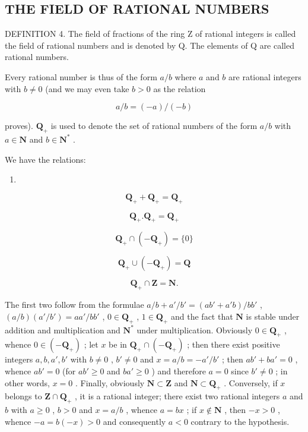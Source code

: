 \subsection{THE FIELD OF RATIONAL NUMBERS}

DEFINITION 4. The field of fractions of the ring Z of rational integers is called the field of rational numbers and is denoted by Q. The elements of Q are called rational numbers.

Every rational number is thus of the form \(a / b\) where \(a\) and \(b\) are rational integers with \(b \neq 0\) (and we may even take \(b > 0\) as the relation

\[
a / b = (- a) / (- b)
\]

proves). \(\mathbf{Q}_{+}\) is used to denote the set of rational numbers of the form \(a / b\) with \(a\in \mathbf{N}\) and \(b\in \mathbf{N}^*\) .

We have the relations:

\begin{enumerate}
\def\labelenumi{(\arabic{enumi})}
\tightlist
\item
\end{enumerate}

\[
\mathbf {Q} _ {+} + \mathbf {Q} _ {+} = \mathbf {Q} _ {+}\tag{2}
\]

\[
\mathbf {Q} _ {+}. \mathbf {Q} _ {+} = \mathbf {Q} _ {+}\tag{3}
\]

\[
\mathbf {Q} _ {+} \cap (- \mathbf {Q} _ {+}) = \{0 \}\tag{4}
\]

\[
\mathbf {Q} _ {+} \cup (- \mathbf {Q} _ {+}) = \mathbf {Q}\tag{5}
\]

\[
\mathbf {Q} _ {+} \cap \mathbf {Z} = \mathbf {N}.
\]

The first two follow from the formulae \(a / b + a' / b' = (ab' + a'b) / bb'\) , \((a / b)(a'/b') = aa'/bb'\) , \(0 \in \mathbf{Q}_+\) , \(1 \in \mathbf{Q}_+\) and the fact that \(\mathbf{N}\) is stable under addition and multiplication and \(\mathbf{N}^*\) under multiplication. Obviously \(0 \in \mathbf{Q}_+\) , whence \(0 \in (-\mathbf{Q}_+)\) ; let \(x\) be in \(\mathbf{Q}_+ \cap (-\mathbf{Q}_+)\) ; then there exist positive integers \(a, b, a', b'\) with \(b \neq 0\) , \(b' \neq 0\) and \(x = a / b = -a'/b'\) ; then \(ab' + ba' = 0\) , whence \(ab' = 0\) (for \(ab' \geqslant 0\) and \(ba' \geqslant 0\) ) and therefore \(a = 0\) since \(b' \neq 0\) ; in other words, \(x = 0\) . Finally, obviously \(\mathbf{N} \subset \mathbf{Z}\) and \(\mathbf{N} \subset \mathbf{Q}_+\) . Conversely, if \(x\) belongs to \(\mathbf{Z} \cap \mathbf{Q}_+\) , it is a rational integer; there exist two rational integers \(a\) and \(b\) with \(a \geqslant 0\) , \(b > 0\) and \(x = a / b\) , whence \(a = bx\) ; if \(x \notin \mathbf{N}\) , then \(-x > 0\) , whence \(-a = b(-x) > 0\) and consequently \(a < 0\) contrary to the hypothesis.

